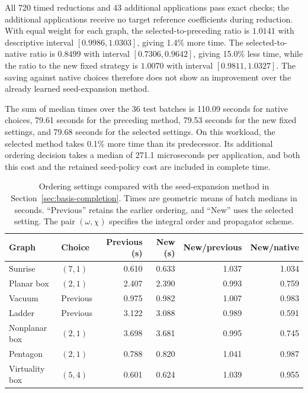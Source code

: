 All 720 timed reductions and 43 additional applications pass exact checks; the additional applications receive no target reference coefficients during reduction. With equal weight for each graph, the selected-to-preceding ratio is $1.0141$ with descriptive interval $[0.9986,1.0303]$, giving 1.4\% more time. The selected-to-native ratio is $0.8499$ with interval $[0.7306,0.9642]$, giving 15.0\% less time, while the ratio to the new fixed strategy is $1.0070$ with interval $[0.9811,1.0327]$. The saving against native choices therefore does not show an improvement over the already learned seed-expansion method.

The sum of median times over the 36 test batches is 110.09 seconds for native choices, 79.61 seconds for the preceding method, 79.53 seconds for the new fixed settings, and 79.68 seconds for the selected settings. On this workload, the selected method takes 0.1\% more time than its predecessor. Its additional ordering decision takes a median of 271.1 microseconds per application, and both this cost and the retained seed-policy cost are included in complete time.

\begin{table}[!htbp]
\centering\small
\caption{Ordering settings compared with the seed-expansion method in Section~\ref{sec:basis-completion}. Times are geometric means of batch medians in seconds. ``Previous'' retains the earlier ordering, and ``New'' uses the selected setting. The pair $(\omega,\chi)$ specifies the integral order and propagator scheme.}
\label{tab:ordering-policy}
\begin{tabular}{@{}llrrrr@{}}\toprule
Graph & Choice & Previous (s) & New (s) & New/previous & New/native\\\midrule
Sunrise & $(7,1)$ & 0.610 & 0.633 & 1.037 & 1.034\\
Planar box & $(2,1)$ & 2.407 & 2.390 & 0.993 & 0.759\\
Vacuum & Previous & 0.975 & 0.982 & 1.007 & 0.983\\
Ladder & Previous & 3.122 & 3.088 & 0.989 & 0.591\\
Nonplanar box & $(2,1)$ & 3.698 & 3.681 & 0.995 & 0.745\\
Pentagon & $(2,1)$ & 0.788 & 0.820 & 1.041 & 0.987\\
Virtuality box & $(5,4)$ & 0.601 & 0.624 & 1.039 & 0.955\\
\bottomrule\end{tabular}
\end{table}

